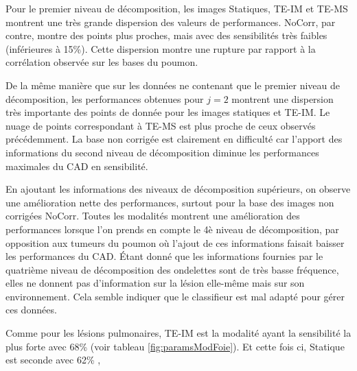 Pour le premier niveau de décomposition, les images Statiques, TE-IM et TE-MS montrent une très grande dispersion des valeurs de performances. NoCorr, par contre, montre des points plus proches, mais avec des sensibilités très faibles (inférieures à 15\%). Cette dispersion montre une rupture par rapport à la corrélation observée sur les bases du poumon.

De la même manière que sur les données ne contenant que le premier niveau de décomposition, les performances obtenues pour $j=2$ montrent une dispersion très importante des points de donnée pour les images statiques et TE-IM. Le nuage de points correspondant à TE-MS est plus proche de ceux observés précédemment. La base non corrigée est clairement en difficulté car l'apport des informations du second niveau de décomposition diminue les performances maximales du CAD en sensibilité.

En ajoutant les informations des niveaux de décomposition supérieurs, on observe une amélioration nette des performances, surtout pour la base des images non corrigées NoCorr. Toutes les modalités montrent une amélioration des performances lorsque l'on  prends en compte le 4è niveau de décomposition, par opposition aux tumeurs du poumon où l'ajout de ces informations faisait baisser les performances du CAD. \'Etant donné que les informations fournies par le quatrième niveau de décomposition des ondelettes sont de très basse fréquence, elles ne donnent pas d'information sur la lésion elle-même mais sur son environnement. Cela semble indiquer que le classifieur est mal adapté pour gérer ces données.


 Comme pour les lésions pulmonaires, TE-IM est la modalité ayant la sensibilité la plus forte avec 68\% (voir tableau \ref{fig:paramsModFoie}). Et cette fois ci, Statique est seconde avec 62\% , 

